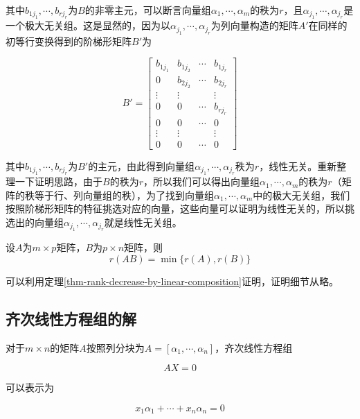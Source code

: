 其中$b_{1j_1},\cdots,b_{rj_r}$为$B$的非零主元，可以断言向量组$\alpha_1,\cdots,\alpha_m$的秩为$r$，且$\alpha_{j_1},\cdots,\alpha_{j_r}$是一个极大无关组。这是显然的，因为以$\alpha_{j_1},\cdots,\alpha_{j_r}$为列向量构造的矩阵$A'$在同样的初等行变换得到的阶梯形矩阵$B'$为

\[
    B'=\begin{bmatrix}
        b_{1j_1} & b_{1j_2} & \cdots & b_{1j_r} \\
        0 & b_{2j_2} & \cdots & b_{2j_r} \\
        \vdots & \vdots &  & \vdots \\
        0 & 0 & \cdots & b_{rj_r} \\
        0 & 0 & \cdots & 0 \\
        \vdots & \vdots & & \vdots \\
        0 & 0 & \cdots & 0
    \end{bmatrix}
\]

其中$b_{1j_1},\cdots,b_{rj_r}$为$B'$的主元，由此得到向量组$\alpha_{j_1},\cdots,\alpha_{j_r}$秩为$r$，线性无关。重新整理一下证明思路，由于$B$的秩为$r$，所以我们可以得出向量组$\alpha_1,\cdots,\alpha_m$的秩为$r$（矩阵的秩等于行、列向量组的秩），为了找到向量组$\alpha_1,\cdots,\alpha_m$中的极大无关组，我们按照阶梯形矩阵的特征挑选对应的向量，这些向量可以证明为线性无关的，所以挑选出的向量组$\alpha_{j_1},\cdots,\alpha_{j_r}$就是线性无关组。

\begin{thm}
    \label{thm-mat-rank-decrease-through-multiplication}
    设$A$为$m\times p$矩阵，$B$为$p\times n$矩阵，则
    \[ r(AB)=\min\{r(A),r(B)\} \]
\end{thm}

可以利用定理\ref{thm-rank-decrease-by-linear-composition}证明，证明细节从略。

\subsection{齐次线性方程组的解}

对于$m\times n$的矩阵$A$按照列分块为$A=[\alpha_1,\cdots,\alpha_n]$，齐次线性方程组

\begin{equation}
    AX=0\label{eq-equations}
\end{equation}

可以表示为

\begin{equation}
    x_1\alpha_1+\cdots+x_n\alpha_n=0\label{eq-equation-vec}
\end{equation}

